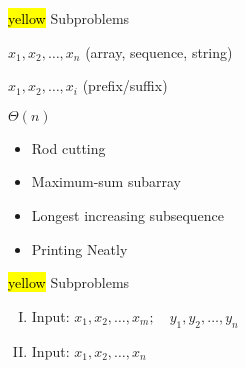 \begin{frame}{}
  \centerline{\hl{yellow}{\Large {} Subproblems}}

  \vspace{0.50cm}
  \begin{description}[Subproblems:]
    \setlength{\itemsep}{8pt}
    \item[Input:] $x_1, x_2, \dots, x_n$ (array, sequence, string)
    \item[Subproblems:] $x_1, x_2, \dots, x_i$ (prefix/suffix)
    \item[\#:] $\Theta(n)$
    \item[Examples:] 
      \begin{itemize}
	\setlength{\itemsep}{4pt}
	\item Rod cutting
	\item Maximum-sum subarray
	\item Longest increasing subsequence
	\item Printing Neatly
      \end{itemize}
  \end{description}
\end{frame}
\begin{frame}{}
  \centerline{\hl{yellow}{\Large {} Subproblems}}

  \vspace{0.50cm}
  \begin{enumerate}[(I)]
    \item Input: $x_{1}, x_{2}, \dots, x_{m}; \quad y_{1}, y_{2}, \dots, y_{n}$ 
      \vspace{3pt}
    \pause
    \vspace{10pt}
    \item Input: $x_{1}, x_{2}, \dots, x_{n}$
      \vspace{3pt}
  \end{enumerate}
\end{frame}

